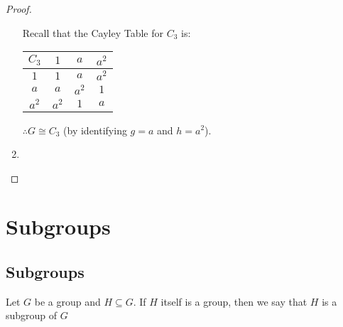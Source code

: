 \begin{proof}
\begin{enumerate}
      Recall that the Cayley Table for $C_3$ is:
      \begin{center}
        \begin{tabular}{c | c c c}
        $C_3$ & $1$   & $a$   & $a^2$ \\
        \hline
        $1$   & $1$   & $a$   & $a^2$ \\
        $a$   & $a$   & $a^2$ & $1$ \\
        $a^2$ & $a^2$ & $1$   & $a$
        \end{tabular}
      \end{center}
      $\therefore G \cong C_3$ (by identifying $g = a$ and $h = a^2$).

    \item {}
  \end{enumerate}
\end{proof}



\section{Subgroups}
\label{sec:subgroups}

\subsection{Subgroups}
\label{sub:subgroups}

\begin{defn}[Subgroup]\label{defn:subgroup}
  Let $G$ be a group and $H \subseteq G$. If $H$ itself is a group, then we say that $H$ is a subgroup of $G$
\end{defn}



